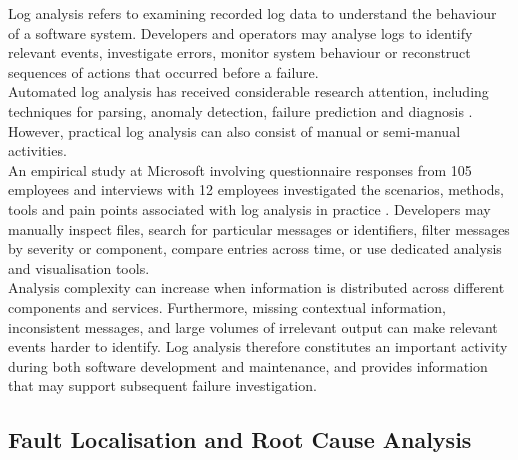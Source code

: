 Log analysis refers to examining recorded log data to understand the behaviour of a software system.
Developers and operators may analyse logs to identify relevant events, investigate errors, monitor system behaviour 
or reconstruct sequences of actions that occurred before a failure.
\\
Automated log analysis has received considerable research attention, including techniques for parsing, anomaly detection,
failure prediction and diagnosis \cite{he2021asurveyonautomatedloganalysis}. However, practical log analysis can also consist of manual or semi-manual activities.
\\
An empirical study at Microsoft involving questionnaire responses from 105 employees and interviews with 12 employees 
investigated the scenarios, methods, tools and pain points associated with log analysis in practice \cite{he2022anempiricalsutdyofloganalysisatmicrosoft}.
Developers may manually inspect files, search for particular messages or identifiers, 
filter messages by severity or component, compare entries across time, or use dedicated analysis and visualisation tools.
\\
Analysis complexity can increase when information is distributed across different components and services. 
Furthermore, missing contextual information, inconsistent messages, and large volumes of irrelevant output can make relevant events harder to identify.
Log analysis therefore constitutes an important activity during both software development
and maintenance, and provides information that may support subsequent failure investigation.

\subsection{Fault Localisation and Root Cause Analysis}
\label{subsec:fault_localisation}

